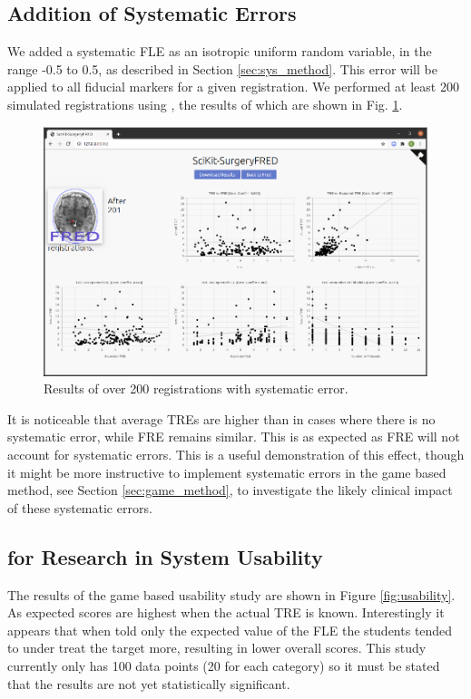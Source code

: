 \subsection{Addition of Systematic Errors}
We added a systematic \gls{FLE} as an isotropic uniform random variable, in the range
-0.5 to 0.5, as described in Section \ref{sec:sys_method}. This error will be applied to all fiducial markers for a 
given registration. We performed at least 200 simulated registrations using \fred, the results of which are shown in Fig. \ref{fig:sys_error}.
\begin{figure}
	\begin{center}
			\includegraphics[width=0.9\linewidth]{images/systematic_error.eps}
			\caption{\label{fig:sys_error}Results of over 200 registrations with systematic error.}
	\end{center}
\end{figure}

It is noticeable that average \gls{TRE}s are higher than in cases where there is no
systematic error, while \gls{FRE} remains similar. This is as expected as \gls{FRE} will 
not account for systematic errors. This is a useful demonstration of this effect, though 
it might be more instructive to implement systematic errors in the game based method, see
Section \ref{sec:game_method}, to investigate the likely clinical impact of these
systematic errors.

\subsection{\fred for Research in System Usability}
The results of the game based usability study are shown in Figure \ref{fig:usability}. As expected scores are 
highest when the actual \gls{TRE} is known. Interestingly it appears that when told only the expected value of the \gls{FLE} the students
tended to under treat the target more, resulting in lower overall scores. This study currently only has 100 data points (20 for each category)
so it must be stated that the results are not yet statistically significant. 

